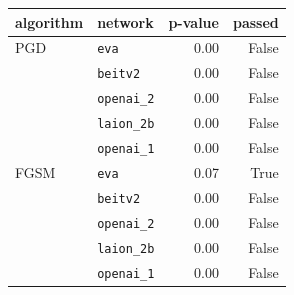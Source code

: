 \begin{tabular}{llrr}
\toprule
algorithm & network & p-value & passed \\
\midrule
PGD & \texttt{eva} & 0.00 & False \\
 & \texttt{beitv2} & 0.00 & False \\
 & \texttt{openai\_2} & 0.00 & False \\
 & \texttt{laion\_2b} & 0.00 & False \\
 & \texttt{openai\_1} & 0.00 & False \\
FGSM & \texttt{eva} & 0.07 & True \\
 & \texttt{beitv2} & 0.00 & False \\
 & \texttt{openai\_2} & 0.00 & False \\
 & \texttt{laion\_2b} & 0.00 & False \\
 & \texttt{openai\_1} & 0.00 & False \\
\bottomrule
\end{tabular}
